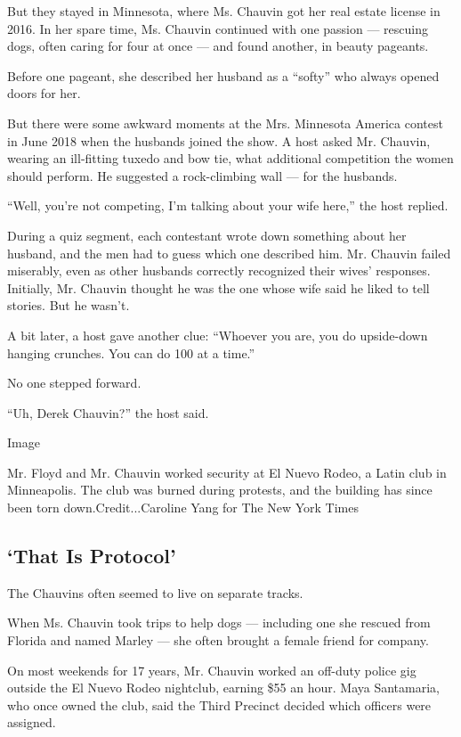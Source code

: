 But they stayed in Minnesota, where Ms. Chauvin got her real estate
license in 2016. In her spare time, Ms. Chauvin continued with one
passion --- rescuing dogs, often caring for four at once --- and found
another, in beauty pageants.

Before one pageant, she described her husband as a ``softy'' who always
opened doors for her.

But there were some awkward moments at the Mrs. Minnesota America
contest in June 2018 when the husbands joined the show. A host asked Mr.
Chauvin, wearing an ill-fitting tuxedo and bow tie, what additional
competition the women should perform. He suggested a rock-climbing wall
--- for the husbands.

``Well, you're not competing, I'm talking about your wife here,'' the
host replied.

During a quiz segment, each contestant wrote down something about her
husband, and the men had to guess which one described him. Mr. Chauvin
failed miserably, even as other husbands correctly recognized their
wives' responses. Initially, Mr. Chauvin thought he was the one whose
wife said he liked to tell stories. But he wasn't.

A bit later, a host gave another clue: ``Whoever you are, you do
upside-down hanging crunches. You can do 100 at a time.''

No one stepped forward.

``Uh, Derek Chauvin?'' the host said.

Image

Mr. Floyd and Mr. Chauvin worked security at El Nuevo Rodeo, a Latin
club in Minneapolis. The club was burned during protests, and the
building has since been torn down.Credit...Caroline Yang for The New
York Times

\hypertarget{that-is-protocol}{%
\subsection{`That Is Protocol'}\label{that-is-protocol}}

The Chauvins often seemed to live on separate tracks.

When Ms. Chauvin took trips to help dogs --- including one she rescued
from Florida and named Marley --- she often brought a female friend for
company.

On most weekends for 17 years, Mr. Chauvin worked an off-duty police gig
outside the El Nuevo Rodeo nightclub, earning \$55 an hour. Maya
Santamaria, who once owned the club, said the Third Precinct decided
which officers were assigned.

